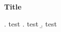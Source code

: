 \documentclass[12pt]{article}
\begin{document}
\begin{center}
\bf Title
\end{center}

 \lipsum[1]

\ex. test
\a. test
\b. test

\noindent  \lipsum[2-3]





\end{document}
